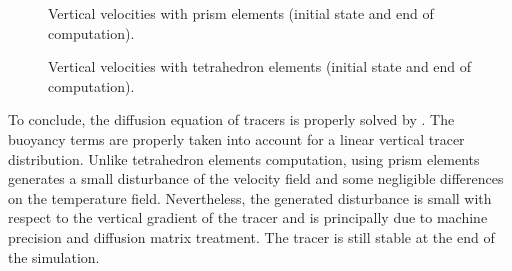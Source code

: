 \begin{figure}[!htbp]
\begin{minipage}[t]{0.50\textwidth}
 \centering
{}
\end{minipage}%
\begin{minipage}[t]{0.50\textwidth}
 \centering
{}
\end{minipage}
 \caption{Vertical velocities with prism elements (initial state and end of computation).}
 \label{t3d:V:fig:prismVelo}
\end{figure}

\begin{figure}[!htbp]
\begin{minipage}[t]{0.50\textwidth}
 \centering
{}
\end{minipage}%
\begin{minipage}[t]{0.50\textwidth}
 \centering
{}
\end{minipage}
 \caption{Vertical velocities with tetrahedron elements (initial state and end of computation).}
 \label{t3d:V:fig:tetraVelo}
\end{figure}

%
\bigskip
To conclude, the diffusion equation of tracers is properly solved by .
The buoyancy terms are properly taken into account for a linear vertical tracer distribution.
Unlike tetrahedron elements computation, using prism elements generates a small disturbance
of the velocity field and some negligible differences on the temperature field. Nevertheless, 
the generated disturbance is small with respect to the vertical gradient of the tracer and is 
principally due to machine precision and diffusion matrix treatment. The tracer is still 
stable at the end of the simulation.

